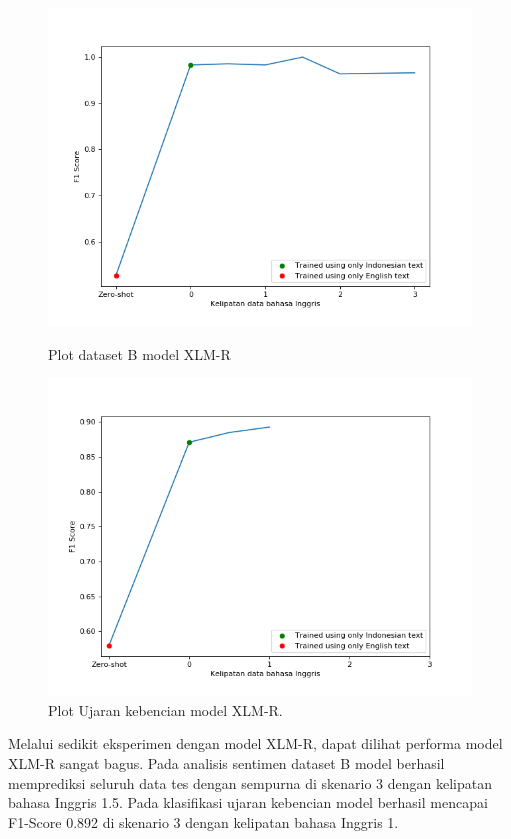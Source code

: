         \begin{figure}[ht]
              \includegraphics[width=\linewidth]{resources/plot-full-prosa-xlmr.png}
              \caption{Plot dataset B model XLM-R}\label{fig:plot_full_prosa_xlmr}
            \endminipage\hfill
              \includegraphics[width=\linewidth]{resources/plot-full-toxic-xlmr.png}
              \caption{Plot Ujaran kebencian model XLM-R.}\label{fig:plot_full_toxic_xlmr}
            \endminipage
        \end{figure}
        
        Melalui sedikit eksperimen dengan model XLM-R, dapat dilihat performa model XLM-R sangat bagus. Pada analisis sentimen dataset B model berhasil memprediksi seluruh data tes dengan sempurna di skenario 3 dengan kelipatan bahasa Inggris 1.5. Pada klasifikasi ujaran kebencian model berhasil mencapai F1-Score 0.892 di skenario 3 dengan kelipatan bahasa Inggris 1.

        
